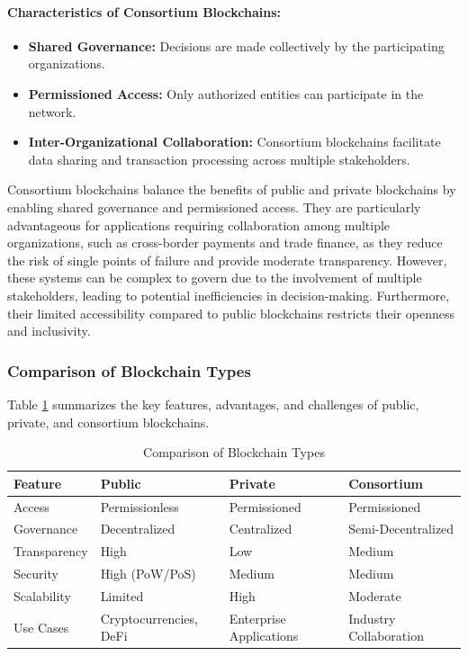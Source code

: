 \paragraph{Characteristics of Consortium Blockchains:}
\begin{itemize}
    \item \textbf{Shared Governance:} Decisions are made collectively by the participating organizations.
    \item \textbf{Permissioned Access:} Only authorized entities can participate in the network.
    \item \textbf{Inter-Organizational Collaboration:} Consortium blockchains facilitate data sharing and transaction processing across multiple stakeholders.
\end{itemize}

Consortium blockchains balance the benefits of public and private blockchains by enabling shared governance and permissioned access. They are particularly advantageous for applications requiring collaboration among multiple organizations, such as cross-border payments and trade finance, as they reduce the risk of single points of failure and provide moderate transparency. However, these systems can be complex to govern due to the involvement of multiple stakeholders, leading to potential inefficiencies in decision-making. Furthermore, their limited accessibility compared to public blockchains restricts their openness and inclusivity.

\subsubsection{Comparison of Blockchain Types}

Table \ref{table:BlockchainComparison} summarizes the key features, advantages, and challenges of public, private, and consortium blockchains. \cite{cachin_blockchain_2017}

\begin{table}[h!]
    \centering
    \caption{Comparison of Blockchain Types}
    \label{table:BlockchainComparison}
    \begin{tabular}{|l|l|l|l|}
        \hline
        \textbf{Feature} & \textbf{Public} & \textbf{Private} & \textbf{Consortium} \\ \hline
        Access & Permissionless & Permissioned & Permissioned \\ \hline
        Governance & Decentralized & Centralized & Semi-Decentralized \\ \hline
        Transparency & High & Low & Medium \\ \hline
        Security & High (PoW/PoS) & Medium & Medium \\ \hline
        Scalability & Limited & High & Moderate \\ \hline
        Use Cases & Cryptocurrencies, DeFi & Enterprise Applications & Industry Collaboration \\ \hline
    \end{tabular}
\end{table}

